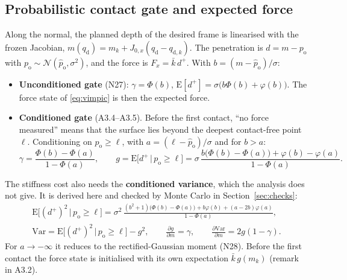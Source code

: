 \documentclass[11pt,a4paper]{article}
\newcommand{\kb}{\bar{k}}
\newcommand{\qd}{q_{\mathrm{d}}}
\newcommand{\phat}{\hat{p}_{\mathrm{o}}}
\begin{document}
\subsection{Probabilistic contact gate and expected force}
Along the normal, the planned depth of the desired frame is linearised with the frozen Jacobian,
$m(\qd)=m_k+J_{0,x}(\qd-q_{\mathrm{d},k})$. The penetration is $d=m-p_\mathrm{o}$ with
$p_\mathrm{o}\sim\mathcal{N}(\phat,\sigma^2)$, and the force is $F_x=\kb\,d^+$. With $b=(m-\phat)/\sigma$:
\begin{itemize}[leftmargin=14pt]
\item \textbf{Unconditioned gate} (N27): $\gamma=\Phi(b)$, $\mathrm{E}[d^+]=\sigma\bigl(b\Phi(b)+\varphi(b)\bigr)$.
  The force state of \eqref{eq:vimpic} is then the expected force.
\item \textbf{Conditioned gate} (A3.4--A3.5). Before the first contact, ``no force measured'' means that
  the surface lies beyond the deepest contact-free point $\ell$. Conditioning on $p_\mathrm{o}\ge\ell$, with
  $a=(\ell-\phat)/\sigma$ and for $b>a$:
\begin{equation}\label{eq:cond}
\gamma=\frac{\Phi(b)-\Phi(a)}{1-\Phi(a)},\qquad
g=\mathrm{E}\bigl[d^+\,\big|\,p_\mathrm{o}\ge\ell\bigr]=\sigma\,\frac{b\bigl(\Phi(b)-\Phi(a)\bigr)+\varphi(b)-\varphi(a)}{1-\Phi(a)} .
\end{equation}
\end{itemize}
The stiffness cost also needs the \textbf{conditioned variance}, which the analysis does not give. It is
derived here and checked by Monte Carlo in Section~\ref{sec:checks}:
\begin{equation}\label{eq:var}
\begin{gathered}
\mathrm{E}\bigl[(d^+)^2\,\big|\,p_\mathrm{o}\ge\ell\bigr]=\sigma^2\,
\frac{(b^2+1)\bigl(\Phi(b)-\Phi(a)\bigr)+b\varphi(b)+(a-2b)\varphi(a)}{1-\Phi(a)},\\
\mathrm{Var}=\mathrm{E}\bigl[(d^+)^2\,\big|\,p_\mathrm{o}\ge\ell\bigr]-g^2,\qquad
\frac{\partial g}{\partial m}=\gamma,\qquad \frac{\partial \mathrm{Var}}{\partial m}=2g(1-\gamma).
\end{gathered}
\end{equation}
For $a\to-\infty$ it reduces to the rectified-Gaussian moment (N28). Before the first contact the force
state is initialised with its own expectation $\kb\,g(m_k)$ (remark in A3.2).
\end{document}
